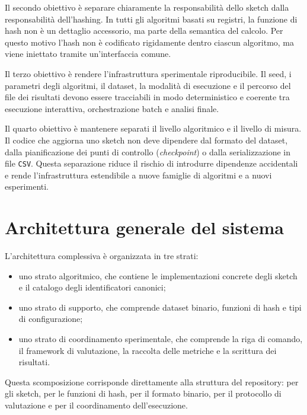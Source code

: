 Il secondo obiettivo è separare chiaramente la responsabilità dello sketch dalla
responsabilità dell'hashing. In tutti gli algoritmi basati su registri, la
funzione di hash non è un dettaglio accessorio, ma parte della semantica del
calcolo. Per questo motivo l'hash non è codificato rigidamente dentro ciascun
algoritmo, ma viene iniettato tramite un'interfaccia comune.

Il terzo obiettivo è rendere l'infrastruttura sperimentale riproducibile. Il
seed, i parametri degli algoritmi, il dataset, la modalità di esecuzione e il
percorso del file dei risultati devono essere tracciabili in modo deterministico
e coerente tra esecuzione interattiva, orchestrazione batch e analisi finale.

Il quarto obiettivo è mantenere separati il livello algoritmico e il livello di
misura. Il codice che aggiorna uno sketch non deve dipendere dal formato del
dataset, dalla pianificazione dei punti di controllo (\emph{checkpoint}) o
dalla serializzazione in file
\texttt{CSV}. Questa separazione riduce il rischio di introdurre dipendenze
accidentali e rende l'infrastruttura estendibile a nuove famiglie di algoritmi e a
nuovi esperimenti.

\section{Architettura generale del sistema}

L'architettura complessiva è organizzata in tre strati:
\begin{itemize}
    \item uno strato algoritmico, che contiene le implementazioni concrete degli
    sketch e il catalogo degli identificatori canonici;
    \item uno strato di supporto, che comprende dataset binario, funzioni di
    hash e tipi di configurazione;
    \item uno strato di coordinamento sperimentale, che comprende la riga di
    comando, il framework di valutazione, la raccolta delle metriche e la
    scrittura dei risultati.
\end{itemize}

Questa scomposizione corrisponde direttamente alla struttura del repository:
 per gli sketch,
 per le funzioni di hash,
 per il formato binario,
 per il protocollo di valutazione e
 per il coordinamento dell'esecuzione.

